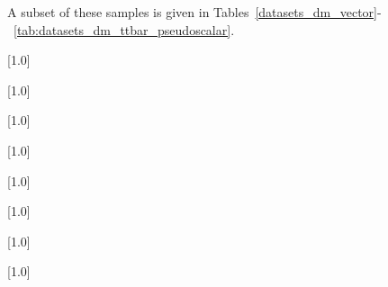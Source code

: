 A subset of these samples is given in Tables~\ref{datasets_dm_vector}-~\ref{tab:datasets_dm_ttbar_pseudoscalar}. 


\begin{table}[!p]
 \centering
{}
 \scriptsize
 \scalebox{.7}[1.0]{}
\label{datasets_dm_vector}
\end{table}

\begin{table}[!p]
 \centering
{}
 \tiny
 \scalebox{.7}[1.0]{}
\label{datasets_dm_axial}
\end{table}

\begin{table}[!p]
 \centering
{}
 \scriptsize
 \scalebox{.7}[1.0]{}
\label{datasets_dm_scalarw}
\end{table}

\begin{table}[!p]
 \centering
{}
 \scriptsize
 \scalebox{.7}[1.0]{}
\label{datasets_dm_pseudoscalar}
\end{table}

\begin{table}[!p]
 \centering
{}
 \scriptsize
 \scalebox{.7}[1.0]{}
\label{datasets_dm_bbar_pseudoscalar}
\end{table}

\begin{table}[!p]
 \centering
{}
 \scriptsize
 \scalebox{.7}[1.0]{}
\label{datasets_dm_bbar_pseudoscalar}
\end{table}

\begin{table}[!p]
 \centering
 \scriptsize
 \scalebox{.7}[1.0]{}
\label{datasets_dm_ttbar_scalar}
\end{table}

\begin{table}[!p]
 \centering
 \scriptsize
 \scalebox{.7}[1.0]{}
 \label{tab:datasets_dm_ttbar_pseudoscalar}
\end{table}





